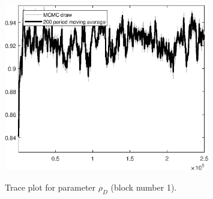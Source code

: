 \begin{figure}[H]
\centering
  \includegraphics[width=0.8\textwidth]{BRS_fd/graphs/TracePlot_rho_D_blck_1}\\
    \caption{Trace plot for parameter ${\rho_D}$ (block number 1).}
\end{figure}
